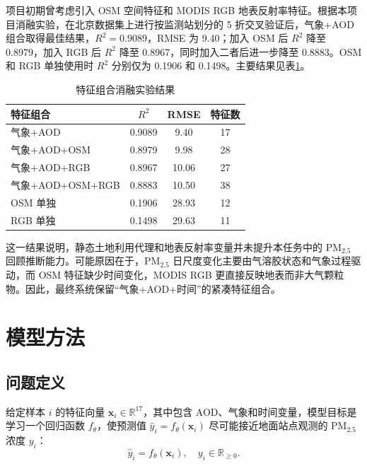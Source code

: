 \documentclass[UTF8,zihao=-4,a4paper]{ctexart}
\newcommand{\pmfine}{PM$_{2.5}$}
\newcommand{\aod}{AOD}
\begin{document}
项目初期曾考虑引入 OSM 空间特征和 MODIS RGB 地表反射率特征。根据本项目消融实验，在北京数据集上进行按监测站划分的 5 折交叉验证后，气象+\aod{} 组合取得最佳结果，$R^2=0.9089$，RMSE 为 9.40；加入 OSM 后 $R^2$ 降至 0.8979，加入 RGB 后 $R^2$ 降至 0.8967，同时加入二者后进一步降至 0.8883。OSM 和 RGB 单独使用时 $R^2$ 分别仅为 0.1906 和 0.1498。主要结果见表\ref{tab:ablation}。

\begin{table}[H]
  \centering
  \caption{特征组合消融实验结果}
  \label{tab:ablation}
  \begin{tabular}{lccc}
    \toprule
    特征组合 & $R^2$ & RMSE & 特征数 \\
    \midrule
    气象+\aod{} & 0.9089 & 9.40 & 17 \\
    气象+\aod{}+OSM & 0.8979 & 9.98 & 28 \\
    气象+\aod{}+RGB & 0.8967 & 10.06 & 27 \\
    气象+\aod{}+OSM+RGB & 0.8883 & 10.50 & 38 \\
    OSM 单独 & 0.1906 & 28.93 & 12 \\
    RGB 单独 & 0.1498 & 29.63 & 11 \\
    \bottomrule
  \end{tabular}
\end{table}

这一结果说明，静态土地利用代理和地表反射率变量并未提升本任务中的 \pmfine{} 回顾推断能力。可能原因在于，\pmfine{} 日尺度变化主要由气溶胶状态和气象过程驱动，而 OSM 特征缺少时间变化，MODIS RGB 更直接反映地表而非大气颗粒物。因此，最终系统保留“气象+\aod{}+时间”的紧凑特征组合。

\section{模型方法}

\subsection{问题定义}

给定样本 $i$ 的特征向量 $\mathbf{x}_i \in \mathbb{R}^{17}$，其中包含 \aod{}、气象和时间变量，模型目标是学习一个回归函数 $f_{\theta}$，使预测值 $\hat{y}_i=f_{\theta}(\mathbf{x}_i)$ 尽可能接近地面站点观测的 \pmfine{} 浓度 $y_i$：
\begin{equation}
  \hat{y}_i = f_{\theta}(\mathbf{x}_i), \quad
  y_i \in \mathbb{R}_{\geq 0}.
  \label{eq:regression}
\end{equation}
\end{document}
